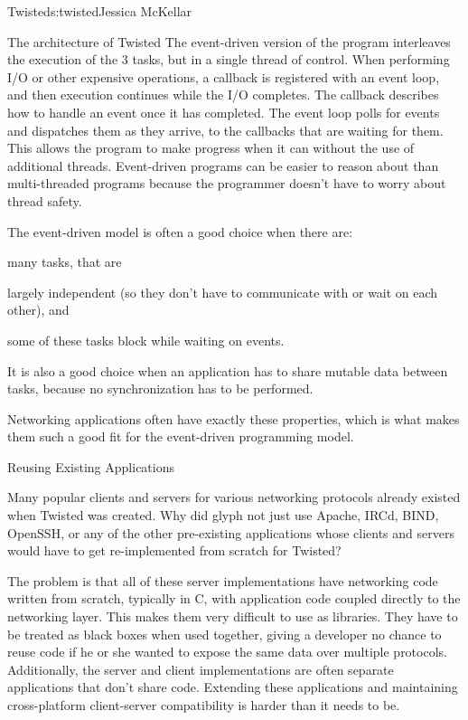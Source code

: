 \begin{aosachapter}{Twisted}{s:twisted}{Jessica McKellar}
\begin{aosasect1}{The architecture of Twisted}
The event-driven version of the program interleaves the execution of the 3
tasks, but in a single thread of control. When performing I/O or other expensive
operations, a callback is registered with an event loop, and then execution
continues while the I/O completes. The callback describes how to handle an event
once it has completed. The event loop polls for events and dispatches them as
they arrive, to the callbacks that are waiting for them. This allows the program
to make progress when it can without the use of additional threads. Event-driven
programs can be easier to reason about than multi-threaded programs because the
programmer doesn't have to worry about thread safety.

The event-driven model is often a good choice when there are:

\begin{aosaenumerate}

\item many tasks, that are

\item largely independent (so they don't have to communicate with or
  wait on each other), and

\item some of these tasks block while waiting on events.

\end{aosaenumerate}

It is also a good choice when an application has to share mutable data
between tasks, because no synchronization has to be performed.

Networking applications often have exactly these properties, which is what
makes them such a good fit for the event-driven programming model.

\begin{aosasect2}{Reusing Existing Applications}

Many popular clients and servers for various networking protocols already
existed when Twisted was created. Why did glyph not just use Apache, IRCd, BIND,
OpenSSH, or any of the other pre-existing applications whose clients and servers
would have to get re-implemented from scratch for Twisted?

The problem is that all of these server implementations have networking code
written from scratch, typically in C, with application code coupled directly to
the networking layer. This makes them very difficult to use as libraries. They
have to be treated as black boxes when used together, giving a developer no
chance to reuse code if he or she wanted to expose the same data over multiple
protocols. Additionally, the server and client implementations are often
separate applications that don't share code. Extending these applications and
maintaining cross-platform client-server compatibility is harder than it needs
to be.


\end{aosasect2}
\end{aosasect1}
\end{aosachapter}
